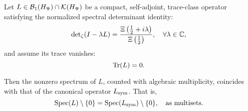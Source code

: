\begin{lemma}
\label{lem:determinant_fixes_spectrum}

Let \( L \in \mathcal{B}_1(H_{\Psi}) \cap \mathcal{K}(H_{\Psi}) \) be a compact, self-adjoint, trace-class operator satisfying the normalized spectral determinant identity:
\[
\det\nolimits_\zeta(I - \lambda L) = \frac{\Xi\left(\tfrac{1}{2} + i\lambda\right)}{\Xi\left(\tfrac{1}{2}\right)},
\quad \forall \lambda \in \mathbb{C},
\]
and assume its trace vanishes:
\[
\operatorname{Tr}(L) = 0.
\]

Then the nonzero spectrum of \( L \), counted with algebraic multiplicity, coincides with that of the canonical operator \( L_{\mathrm{sym}} \). That is,
\[
\operatorname{Spec}(L) \setminus \{0\} = \operatorname{Spec}(L_{\mathrm{sym}}) \setminus \{0\},
\quad \text{as multisets}.
\]
\end{lemma}
